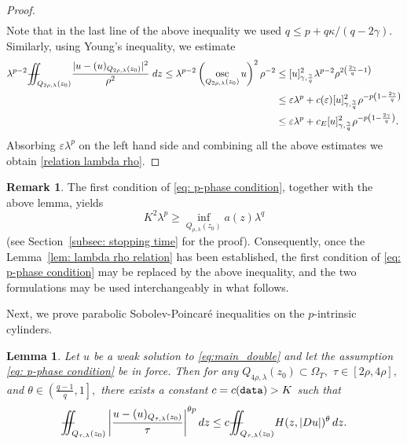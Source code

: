\documentclass[notitlepage,11pt,reqno]{amsart}
\newtheorem{lemma}[theorem]{Lemma}
\theoremstyle{definition}
\newtheorem{remark}[theorem]{Remark}
\numberwithin{equation}{section}
\newcommand{\la}{\lambda}
\DeclareMathOperator*{\osc}{osc}
\newcommand{\iintss}{{\int\hspace{-0.28cm}\int}}
\newcommand{ \miints }{{\iintss\hspace{-0.56cm} -\hspace{-0.15cm}-}}
\newcommand{\miint}[1]{{\miints_{\hspace{-0.13cm}#1}}}
\begin{document}
\begin{proof}
\begin{align*}
 \end{align*}
 Note that in the last line of the above inequality we used $q \leq p+q\kappa/ (q-2\gamma).$ Similarly, using Young's inequality, we estimate
 \begin{align*}
  \lambda^{p-2}\miint{Q_{2\rho, \lambda}(z_0)}\frac{|u-(u)_{Q_{2\rho,\lambda}(z_0)}|^2}{\rho^2}\;dz\leq \lambda^{p-2}\left(\osc_{Q_{2\rho, \lambda}(z_0)} u\right)^2\rho^{-2}&\leq [u]^2_{\gamma, \frac{\gamma}{q}}\lambda^{p-2}\rho^{2\left(\frac{2\gamma}{q}-1\right)} \\
  &\leq \varepsilon \lambda^p+c(\varepsilon)[u]^2_{\gamma, \frac{\gamma}{q}} \rho^{-p\left(1-\frac{2\gamma}{q}\right)}\\
  &\leq \varepsilon \lambda^p+c_E[u]^2_{\gamma, \frac{\gamma}{q}} \rho^{-p\left(1-\frac{2\gamma}{q}\right)}.
 \end{align*}
 Absorbing $\varepsilon \la^p$ on the left hand side and combining all the above estimates we obtain \eqref{relation lambda rho}.
\end{proof}
\begin{remark}\label{REM3.3}
The first condition of \eqref{eq: p-phase condition}, together with the above lemma, yields
$$K^2\lambda^p\geq \inf_{Q_{\rho, \lambda}(z_0)}a(z)\lambda^q$$
(see Section~\ref{subsec: stopping time} for the proof). Consequently, once the Lemma~\ref{lem: lambda rho relation} has been established, the first condition of \eqref{eq: p-phase condition} may be replaced by the above inequality, and the two formulations may be used interchangeably in what follows.
\end{remark}
Next, we prove parabolic Sobolev-Poincar\'e inequalities on the $p$-intrinsic cylinders.
\begin{lemma}\label{p_intrinsic poincare 2}
Let $u$ be a weak solution to \eqref{eq:main_double} and let the assumption \ref{eq: p-phase condition} be in force. Then for any $Q_{4\rho, \lambda}(z_0)\subset \Omega_T,$ $\tau \in [2\rho, 4\rho],$ and $\theta\in \left(\frac{q-1}{q}, 1\right],$ there exists a constant $c=c(\textnormal{\texttt{data}})>K$ such that 
 \begin{align}\label{1_lem7.4} 
\miint{Q_{\tau, \lambda}(z_0)}\left|\frac{u-(u)_{Q_{\tau, \lambda}(z_0)}}{\tau}\right|^{\theta p} dz \leq c \miint{Q_{\tau, \lambda}(z_0)}H(z, |Du|)^{\theta}\, dz.
\end{align}
\end{lemma}
\end{document}
